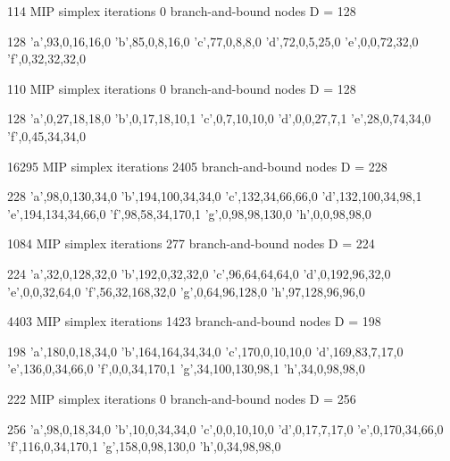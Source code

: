 114 MIP simplex iterations
0 branch-and-bound nodes
D = 128

128
'a',93,0,16,16,0
'b',85,0,8,16,0
'c',77,0,8,8,0
'd',72,0,5,25,0
'e',0,0,72,32,0
'f',0,32,32,32,0



110 MIP simplex iterations
0 branch-and-bound nodes
D = 128

128
'a',0,27,18,18,0
'b',0,17,18,10,1
'c',0,7,10,10,0
'd',0,0,27,7,1
'e',28,0,74,34,0
'f',0,45,34,34,0






16295 MIP simplex iterations
2405 branch-and-bound nodes
D = 228

228
'a',98,0,130,34,0
'b',194,100,34,34,0
'c',132,34,66,66,0
'd',132,100,34,98,1
'e',194,134,34,66,0
'f',98,58,34,170,1
'g',0,98,98,130,0
'h',0,0,98,98,0



1084 MIP simplex iterations
277 branch-and-bound nodes
D = 224

224
'a',32,0,128,32,0
'b',192,0,32,32,0
'c',96,64,64,64,0
'd',0,192,96,32,0
'e',0,0,32,64,0
'f',56,32,168,32,0
'g',0,64,96,128,0
'h',97,128,96,96,0






4403 MIP simplex iterations
1423 branch-and-bound nodes
D = 198

198
'a',180,0,18,34,0
'b',164,164,34,34,0
'c',170,0,10,10,0
'd',169,83,7,17,0
'e',136,0,34,66,0
'f',0,0,34,170,1
'g',34,100,130,98,1
'h',34,0,98,98,0



222 MIP simplex iterations
0 branch-and-bound nodes
D = 256

256
'a',98,0,18,34,0
'b',10,0,34,34,0
'c',0,0,10,10,0
'd',0,17,7,17,0
'e',0,170,34,66,0
'f',116,0,34,170,1
'g',158,0,98,130,0
'h',0,34,98,98,0


\fi






	\newpage

